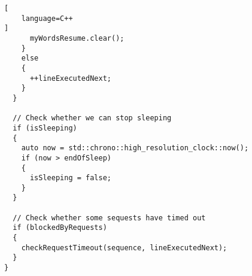 \begin{lstlisting}[
	language=C++
]
      myWordsResume.clear();
    }
    else
    {
      ++lineExecutedNext;
    }
  }

  // Check whether we can stop sleeping
  if (isSleeping)
  {
    auto now = std::chrono::high_resolution_clock::now();
    if (now > endOfSleep)
    {
      isSleeping = false;
    }
  }

  // Check whether some sequests have timed out
  if (blockedByRequests)
  {
    checkRequestTimeout(sequence, lineExecutedNext);
  }
}
\end{lstlisting}














